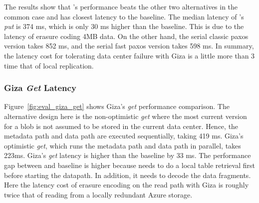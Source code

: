 The results show that \name's performance beats the other two alternatives in the common case and has closest
latency to the baseline. The median latency of \name's {\em put} is 374 ms, which is only 30 ms
higher than the baseline. This is due to the latency of erasure coding 4MB data. On the other hand, the serial classic paxos version takes 
852 ms, and the serial fast paxos version takes 598 ms. In summary, the latency cost for tolerating data center failure with Giza is a little more than 3 time that of local replication.

\subsubsection{Giza {\em Get} Latency}

Figure~\ref{fig:eval_giza_get} shows Giza's {\em get} performance comparison. The alternative design here is the non-optimistic {\em get } where the most current version for a blob is not assumed to be stored in the current data center. Hence, the metadata path and data path are executed sequentially, taking 419 ms. Giza's optimistic {\em get}, which runs the metadata path and data path in parallel, takes 223ms. Giza's {\em get} latency is higher than the baseline by 33 ms. The performance gap between \name and baseline is higher because \name needs to do a local table retrieval first before starting the datapath. In addition, it needs to decode the data fragments. Here the latency cost of erasure encoding on the read path with Giza is roughly twice that of reading from a locally redundant Azure storage.





